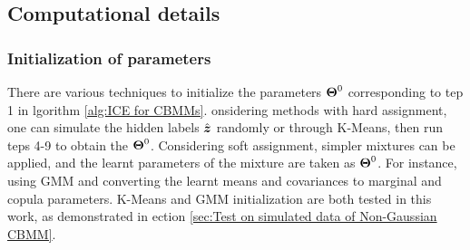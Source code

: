 \subsection{Computational details}
\label{sec:Computational details}

\subsubsection{Initialization of parameters}
\label{sec:Initialization of parameters}

There are various techniques to initialize the parameters $\boldsymbol{\Theta}^{0}$ corresponding to tep 1 in lgorithm \ref{alg:ICE for CBMMs}. onsidering methods with hard assignment, one can simulate the hidden labels $\hat{\mathrm{\boldsymbol{z}}}$ randomly or through K-Means, %
then run teps 4-9 to obtain the $\boldsymbol{\Theta}^{0}$. Considering soft assignment, simpler mixtures can be applied, and the learnt parameters of the mixture are taken as $\boldsymbol{\Theta}^{0}$. %
For instance, using GMM and converting the learnt means and covariances to marginal and copula parameters. K-Means and GMM initialization are both tested in this work, as demonstrated in ection \ref{sec:Test on simulated data of Non-Gaussian CBMM}.


